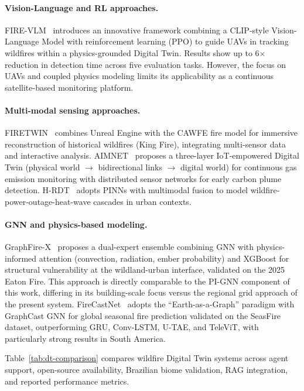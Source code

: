 \documentclass[preprint,12pt,times,numbers]{elsarticle}
\begin{document}
\paragraph{Vision-Language and RL approaches.} FIRE-VLM~\cite{article:webb2026} introduces an innovative framework combining a CLIP-style Vision-Language Model with reinforcement learning (PPO) to guide UAVs in tracking wildfires within a physics-grounded Digital Twin. Results show up to 6$\times$ reduction in detection time across five evaluation tasks. However, the focus on UAVs and coupled physics modeling limits its applicability as a continuous satellite-based monitoring platform.

\paragraph{Multi-modal sensing approaches.} FIRETWIN~\cite{article:raha2025} combines Unreal Engine with the CAWFE fire model for immersive reconstruction of historical wildfires (King Fire), integrating multi-sensor data and interactive analysis. AIMNET~\cite{article:aimnet2025} proposes a three-layer IoT-empowered Digital Twin (physical world $\rightarrow$ bidirectional links $\rightarrow$ digital world) for continuous gas emission monitoring with distributed sensor networks for early carbon plume detection. H-RDT~\cite{article:hrdt2025} adopts PINNs with multimodal fusion to model wildfire-power-outage-heat-wave cascades in urban contexts.

\paragraph{GNN and physics-based modeling.} GraphFire-X~\cite{article:esparza2025} proposes a dual-expert ensemble combining GNN with physics-informed attention (convection, radiation, ember probability) and XGBoost for structural vulnerability at the wildland-urban interface, validated on the 2025 Eaton Fire. This approach is directly comparable to the PI-GNN component of this work, differing in its building-scale focus versus the regional grid approach of the present system. FireCastNet~\cite{article:michail2025} adopts the ``Earth-as-a-Graph'' paradigm with GraphCast GNN for global seasonal fire prediction validated on the SeasFire dataset, outperforming GRU, Conv-LSTM, U-TAE, and TeleViT, with particularly strong results in South America.

Table~\ref{tab:dt-comparison} compares wildfire Digital Twin systems across agent support, open-source availability, Brazilian biome validation, RAG integration, and reported performance metrics.
\end{document}
